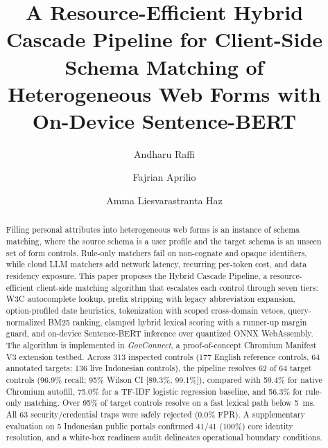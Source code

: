 \documentclass[11pt,runningheads,a4paper]{llncs}
\begin{document}
\title{A Resource-Efficient Hybrid Cascade Pipeline for Client-Side Schema Matching of Heterogeneous Web Forms with On-Device Sentence-BERT}

\author{Andharu Raffi \and Fajrian Aprilio \and
Amma Liesvarastranta Haz}

\maketitle

\begin{abstract}
Filling personal attributes into heterogeneous web forms is an instance of schema matching, where the source schema is a user profile and the target schema is an unseen set of form controls. Rule-only matchers fail on non-cognate and opaque identifiers, while cloud LLM matchers add network latency, recurring per-token cost, and data residency exposure. This paper proposes the Hybrid Cascade Pipeline, a resource-efficient client-side matching algorithm that escalates each control through seven tiers: W3C autocomplete lookup, prefix stripping with legacy abbreviation expansion, option-profiled date heuristics, tokenization with scoped cross-domain vetoes, query-normalized BM25 ranking, clamped hybrid lexical scoring with a runner-up margin guard, and on-device Sentence-BERT inference over quantized ONNX WebAssembly. The algorithm is implemented in \emph{GovConnect}, a proof-of-concept Chromium Manifest V3 extension testbed. Across 313 inspected controls (177 English reference controls, 64 annotated targets; 136 live Indonesian controls), the pipeline resolves 62 of 64 target controls (96.9\% recall; 95\% Wilson CI [89.3\%, 99.1\%]), compared with 59.4\% for native Chromium autofill, 75.0\% for a TF-IDF logistic regression baseline, and 56.3\% for rule-only matching. Over 95\% of target controls resolve on a fast lexical path below 5~ms. All 63 security/credential traps were safely rejected (0.0\% FPR). A supplementary evaluation on 5 Indonesian public portals confirmed 41/41 (100\%) core identity resolution, and a white-box readiness audit delineates operational boundary conditions.
\end{abstract}
\end{document}
